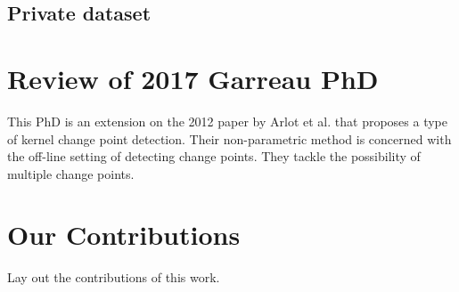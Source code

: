 \subsection{Private dataset}
  
\section{Review of 2017 Garreau PhD }
This PhD is an extension on the 2012 paper by Arlot et al. \cite{arlot2012kernel} that proposes a type of kernel change point detection. Their non-parametric method is concerned with the off-line setting of detecting change points. They tackle the possibility of multiple change points.


\section{Our Contributions}
Lay out the contributions of this work.